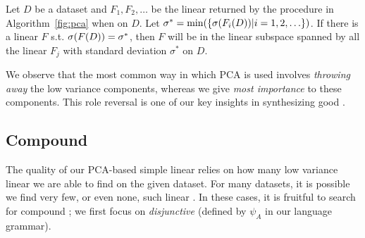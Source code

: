 {\begin{theorem}
    Let $D$ be a dataset and
    $F_1,F_2,\ldots$ be the linear \views returned by the procedure in Algorithm~\ref{fig:pca} 
    when on $D$.
    Let $\sigma^* = \min(\{{\mathtt{\sigma}}(F_i(D)) | i=1,2,\ldots\})$.
    If there is a linear \view $F$ s.t. ${\mathtt{\sigma}}(F(D)) = \sigma^*$, then $F$ will be in the linear subspace spanned by all the linear
     $F_j$ with standard deviation $\sigma^*$ on $D$.
\end{theorem}


We observe that the most common way in which PCA is used involves {\em{throwing
away}} the low variance components, whereas we give {\em{most importance}} to
these components. This role reversal is one of our key insights in synthesizing good
\dis.

\endignore}



\subsection{Compound \DIs}\label{sec:disjunctive}
The quality of our PCA-based simple linear \invariants relies on how many low
variance linear \views we are able to find on the given dataset. For many
datasets, it is possible we find very few, or even none, such linear \views. In
these cases, it is fruitful to search for compound \invariants; we first focus
on {\em{disjunctive \invariants}} (defined by $\psi_A$ in our language grammar).

